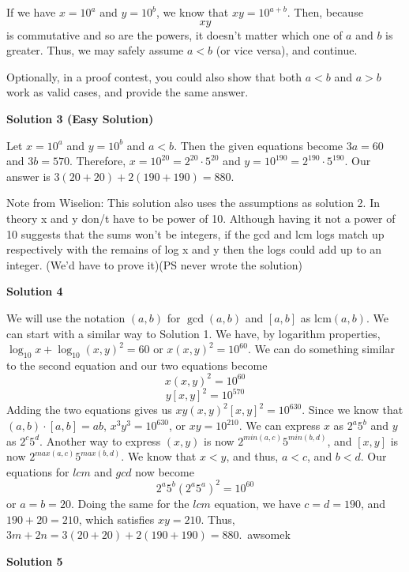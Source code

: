 \begin{enumerate}
 If we have \( x = 10^a \) and \( y = 10^b \), we know that \( xy = 10^{a+b} \). Then, because 
 \[xy\] is commutative and so are the powers, it doesn't matter which one of \( a \) and \( b \) is greater. Thus, we may safely assume \( a < b \) (or vice versa), and continue.

 Optionally, in a proof contest, you could also show that both $a < b$ and $a > b$ work as valid cases, and provide the same answer.

 



\textbf{Solution 3 (Easy Solution)}

Let $x=10^a$ and $y=10^b$ and $a<b$. Then the given equations become $3a=60$ and $3b=570$. Therefore, $x=10^{20}=2^{20}\cdot5^{20}$ and $y=10^{190}=2^{190}\cdot5^{190}$. Our answer is $3(20+20)+2(190+190)=\boxed{880}$.

 Note from Wiselion: This solution also uses the assumptions as solution 2. In theory x and y don/t have to be power of 10. Although having it not a power of 10 suggests that the sums won't be integers, if the gcd and lcm logs match up respectively with the remains of  log x and y then the logs could add up to an integer. (We'd have to prove it)(PS never wrote the solution)

 



\textbf{Solution 4}

We will use the notation $(a, b)$ for $\gcd(a, b)$ and $[a, b]$ as $\text{lcm}(a, b)$. We can start with a similar way to Solution 1. We have, by logarithm properties, $\log_{10}{x}+\log_{10}{(x, y)^2}=60$ or $x(x, y)^2=10^{60}$. We can do something similar to the second equation and our two equations become 
 \[x(x, y)^2=10^{60}\] 
 \[y[x, y]^2=10^{570}\]Adding the two equations gives us $xy(x, y)^2[x, y]^2=10^{630}$. Since we know that $(a, b)\cdot[a, b]=ab$, $x^3y^3=10^{630}$, or $xy=10^{210}$. We can express $x$ as $2^a5^b$ and $y$ as $2^c5^d$. Another way to express $(x, y)$ is now $2^{min(a, c)}5^{min(b, d)}$, and $[x, y]$ is now $2^{max(a, c)}5^{max(b, d)}$. We know that $x<y$, and thus, $a<c$, and $b<d$. Our equations for $lcm$ and $gcd$ now become 
 \[2^a5^b(2^a5^a)^2=10^{60}\] or $a=b=20$. Doing the same for the $lcm$ equation, we have $c=d=190$, and $190+20=210$, which satisfies $xy=210$. Thus, $3m+2n=3(20+20)+2(190+190)=\boxed{880}$.~awsomek

 



\textbf{Solution 5}


\end{enumerate}
